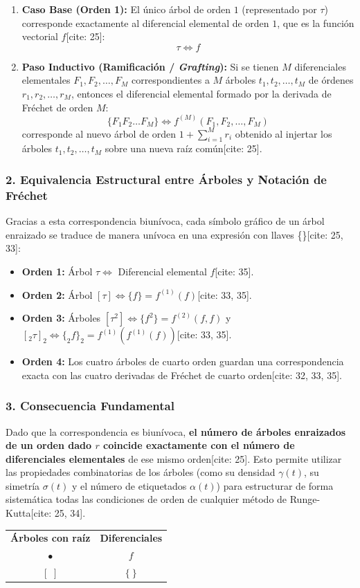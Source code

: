 \begin{enumerate}
    \item \textbf{Caso Base (Orden 1):} El único árbol de orden $1$ (representado por $\tau$) corresponde exactamente al diferencial elemental de orden $1$, que es la función vectorial $f$[cite: 25]:
    \[
    \tau \iff f
    \]
    
    \item \textbf{Paso Inductivo (Ramificación / \textit{Grafting}):} Si se tienen $M$ diferenciales elementales $F_1, F_2, \dots, F_M$ correspondientes a $M$ árboles $t_1, t_2, \dots, t_M$ de órdenes $r_1, r_2, \dots, r_M$, entonces el diferencial elemental formado por la derivada de Fréchet de orden $M$:
    \[
    \{F_1 F_2 \dots F_M\} \iff f^{(M)}(F_1, F_2, \dots, F_M)
    \]
    corresponde al nuevo árbol de orden $1 + \sum_{i=1}^M r_i$ obtenido al injertar los árboles $t_1, t_2, \dots, t_M$ sobre una nueva raíz común[cite: 25].
\end{enumerate}

\subsubsection*{2. Equivalencia Estructural entre Árboles y Notación de Fréchet}
Gracias a esta correspondencia biunívoca, cada símbolo gráfico de un árbol enraizado se traduce de manera unívoca en una expresión con llaves \{\}[cite: 25, 33]:
\begin{itemize}
    \item \textbf{Orden 1:} Árbol $\tau \iff$ Diferencial elemental $f$[cite: 35].
    \item \textbf{Orden 2:} Árbol $[\tau] \iff \{f\} = f^{(1)}(f)$[cite: 33, 35].
    \item \textbf{Orden 3:} Árboles $[\tau^2] \iff \{f^2\} = f^{(2)}(f, f)$ y $[_2\tau]_2 \iff \{_2f\}_2 = f^{(1)}(f^{(1)}(f))$[cite: 33, 35].
    \item \textbf{Orden 4:} Los cuatro árboles de cuarto orden guardan una correspondencia exacta con las cuatro derivadas de Fréchet de cuarto orden[cite: 32, 33, 35].
\end{itemize}

\subsubsection*{3. Consecuencia Fundamental}
Dado que la correspondencia es biunívoca, \textbf{el número de árboles enraizados de un orden dado $r$ coincide exactamente con el número de diferenciales elementales} de ese mismo orden[cite: 25]. Esto permite utilizar las propiedades combinatorias de los árboles (como su densidad $\gamma(t)$, su simetría $\sigma(t)$ y el número de etiquetados $\alpha(t)$) para estructurar de forma sistemática todas las condiciones de orden de cualquier método de Runge-Kutta[cite: 25, 34].
\begin{center}
\begin{tabular}{cc}
\textbf{Árboles con raíz} & \textbf{Diferenciales} \\
$\bullet$ & $f$ \\
$[\, \, ]$ & $\{\ \}$
\end{tabular}
\end{center}

